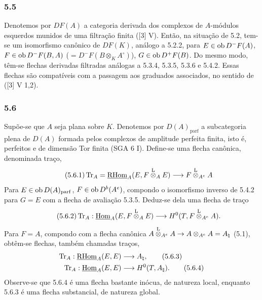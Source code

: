 \subsubsection*{5.5}

Denotemos por $DF(A)$ a categoria derivada dos complexos de $A$-módulos esquerdos munidos de uma filtração finita ([3] V). Então, na situação de 5.2, tem-se um isomorfismo canônico de $DF(K)$, análogo a 5.2.2, para $E\in\operatorname{ob} D^-F(A)$, $F\in\operatorname{ob} D^-F(B,A)$ ($=D^-F(B\otimes_KA^\circ)$), $G\in\operatorname{ob} D^+F(B)$. Do mesmo modo, têm-se flechas derivadas filtradas análogas a 5.3.4, 5.3.5, 5.3.6 e 5.4.2. Essas flechas são compatíveis com a passagem aos graduados associados, no sentido de ([3] V 1,2).

\subsubsection*{5.6}

Supõe-se que $A$ seja plana sobre $K$. Denotemos por $D(A)_{\mathrm{parf}}$ a subcategoria plena de $D(A)$ formada pelos complexos de amplitude perfeita finita, isto é, perfeitos e de dimensão Tor finita (SGA 6 I). Define-se uma flecha canônica, denominada traço,
\begin{equation}\tag{5.6.1}
\operatorname{Tr}_A=\underline{\mathrm{RHom}}_A(E,F\overset{\mathrm L}{\otimes}_AE)\longrightarrow F\overset{\mathrm L}{\otimes}_{A^e}A
\end{equation}
Para $E\in\operatorname{ob} D(A)_{\mathrm{parf}}$, $F\in\operatorname{ob} D^b(A^e)$, compondo o isomorfismo inverso de 5.4.2 para $G=E$ com a flecha de avaliação 5.3.5. Deduz-se dela uma flecha de traço
\begin{equation}\tag{5.6.2}
\operatorname{Tr}_A:\underline{\operatorname{Hom}}_A(E,F\overset{\mathrm L}{\otimes}_AE)\longrightarrow H^0(T,F\overset{\mathrm L}{\otimes}_{A^e}A).
\end{equation}
Para $F=A$, compondo com a flecha canônica $A\overset{\mathrm L}{\otimes}_{A^e}A\to A\otimes_{A^e}A=A_\natural$ (5.1), obtêm-se flechas, também chamadas traços,
\begin{align}
\operatorname{Tr}_A:\underline{\mathrm{RHom}}_A(E,E)&\longrightarrow A_\natural,\tag{5.6.3}\\
\operatorname{Tr}_A:\underline{\operatorname{Hom}}_A(E,E)&\longrightarrow H^0(T,A_\natural).\tag{5.6.4}
\end{align}
Observe-se que 5.6.4 é uma flecha bastante inócua, de natureza local, enquanto 5.6.3 é uma flecha substancial, de natureza global.

